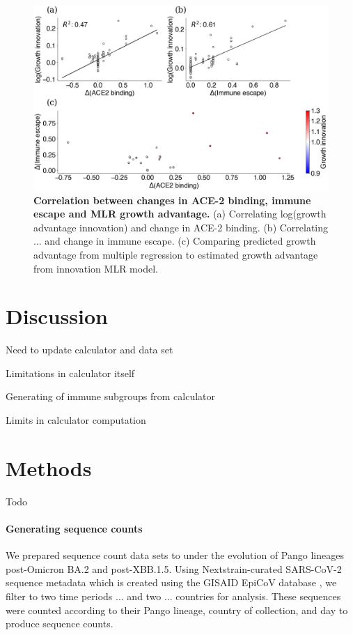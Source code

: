 \documentclass[12pt,oneside,letterpaper]{article}
\begin{document}
\begin{figure}[h]
	\centering
	\includegraphics[width=1.0\textwidth]{figures/binding-escape-score-growth-advantage-innovations}
	\caption{\textbf{Correlation between changes in ACE-2 binding, immune escape and MLR growth advantage.}
        (a) Correlating log(growth advantage innovation) and change in ACE-2 binding. 
        (b) Correlating ... and change in immune escape.
        (c) Comparing predicted growth advantage from multiple regression to estimated growth advantage from innovation MLR model.
	}
	\label{binding-escape-score-growth-advantage-innovations-3}
\end{figure}


\section*{Discussion}

Need to update calculator and data set

Limitations in calculator itself

Generating of immune subgroups from calculator

Limits in calculator computation


\section*{Methods}

Todo

\paragraph{Generating sequence counts}%

We prepared sequence count data sets to under the evolution of Pango lineages post-Omicron BA.2 and post-XBB.1.5. 
Using Nextstrain-curated SARS-CoV-2 sequence metadata \cite{hadfield2018nextstrain} which is created using the GISAID EpiCoV database \cite{khare2021gisaid}, we filter to two time periods ... and two ... countries for analysis. 
These sequences were counted according to their Pango lineage, country of collection, and day to produce sequence counts.
\end{document}
